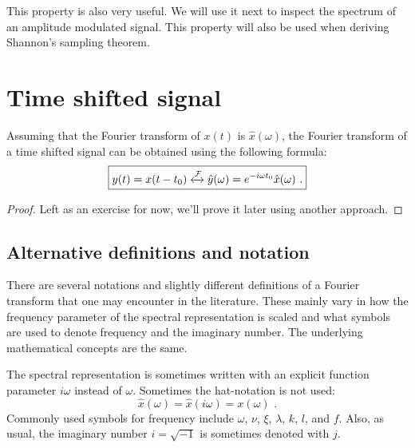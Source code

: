 This property is also very useful. We will use it next to inspect the spectrum of an amplitude modulated signal. This property will also be used when deriving Shannon's sampling theorem.

\section{Time shifted signal}
Assuming that the Fourier transform of $x(t)$ is $\hat{x}(\omega)$, the Fourier transform of a  time shifted signal can be obtained using the following formula:
\begin{equation}
\boxed{y(t) = x(t-t_0) \xleftrightarrow{\mathcal{F}} \hat{y}(\omega)= e^{-i\omega t_0}\hat{x}(\omega)\,\,.}
\label{eq:ft:timeshift}
\end{equation}
\begin{proof}
Left as an exercise for now, we'll prove it later using another approach. 
\end{proof}

\subsection{Alternative definitions and notation}
There are several notations and slightly different definitions of a Fourier transform that one may encounter in the literature. 
These mainly vary in how the frequency parameter of the spectral representation is scaled and what symbols are used to denote frequency and the imaginary number. 
The underlying mathematical concepts are the same. 

The spectral representation is sometimes written with an explicit function parameter $i\omega$ instead of $\omega$. Sometimes the hat-notation is not used:
\begin{equation}
\hat{x}(\omega) = \hat{x}(i\omega) = x(\omega)\,\,.
\end{equation}
Commonly used symbols for frequency include $\omega$, $\nu$, $\xi$, $\lambda$, $k$, $l$, and $f$. Also, as usual, the imaginary number $i=\sqrt{-1}$ is sometimes denoted with $j$.

